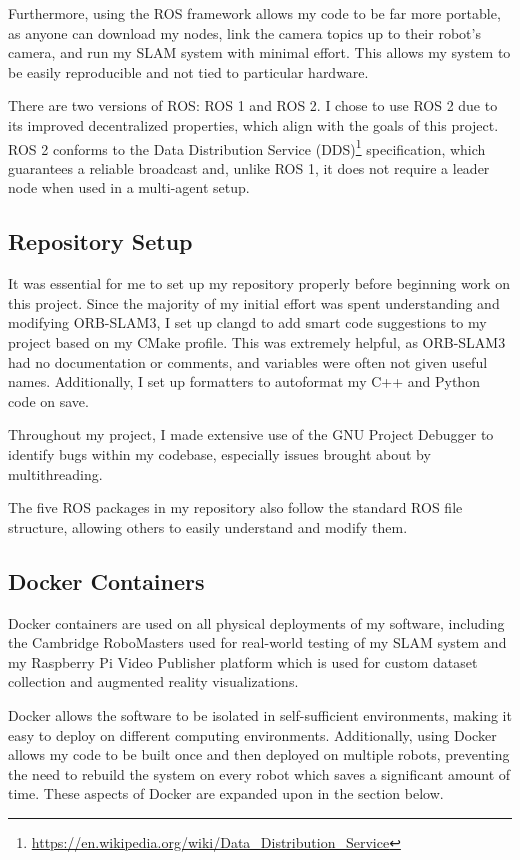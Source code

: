Furthermore, using the ROS framework allows my code to be far more portable, as anyone can download my nodes, link the camera topics up to their robot's camera, and run my SLAM system with minimal effort. This allows my system to be easily reproducible and not tied to particular hardware.

There are two versions of ROS: ROS 1 and ROS 2. I chose to use ROS 2 due to its improved decentralized properties, which align with the goals of this project. ROS 2 conforms to the Data Distribution Service (DDS)\footnote[1]{\url{https://en.wikipedia.org/wiki/Data_Distribution_Service}} specification, which guarantees a reliable broadcast and, unlike ROS 1, it does not require a leader node when used in a multi-agent setup.

\subsection{Repository Setup}
\label{sec:repository-setup}
It was essential for me to set up my repository properly before beginning work on this project. Since the majority of my initial effort was spent understanding and modifying ORB-SLAM3, I set up clangd to add smart code suggestions to my project based on my CMake profile. This was extremely helpful, as ORB-SLAM3 had no documentation or comments, and variables were often not given useful names. Additionally, I set up formatters to autoformat my C++ and Python code on save.

Throughout my project, I made extensive use of the GNU Project Debugger to identify bugs within my codebase, especially issues brought about by multithreading.

The five ROS packages in my repository also follow the standard ROS file structure, allowing others to easily understand and modify them.

\subsection{Docker Containers}
\label{sec:docker-containers}
Docker containers are used on all physical deployments of my software, including the Cambridge RoboMasters used for real-world testing of my SLAM system and my Raspberry Pi Video Publisher platform which is used for custom dataset collection and augmented reality visualizations.

Docker allows the software to be isolated in self-sufficient environments, making it easy to deploy on different computing environments. Additionally, using Docker allows my code to be built once and then deployed on multiple robots, preventing the need to rebuild the system on every robot which saves a significant amount of time. These aspects of Docker are expanded upon in the section below.

